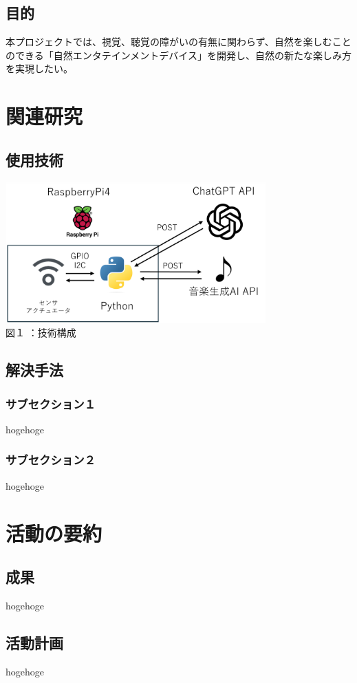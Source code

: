 \documentclass[12pt,a4paper]{report}
\begin{document}
\noindent
\section{目的}
\noindent\space
本プロジェクトでは、視覚、聴覚の障がいの有無に関わらず、自然を楽しむことのできる「自然エンタテインメントデバイス」を開発し、自然の新たな楽しみ方を実現したい。

\chapter{関連研究}
\section{使用技術}
\noindent
\space
\begin{center}
  \includegraphics[width=100mm]{images/tech-conf.png}\\
  図１  ：技術構成
\end{center}
\section{解決手法}
\subsection{サブセクション１}
\noindent
hogehoge
\subsection{サブセクション２}
\noindent
hogehoge

\chapter{活動の要約}
\section{成果}
\noindent
hogehoge
\section{活動計画}
\noindent
hogehoge
\end{document}
